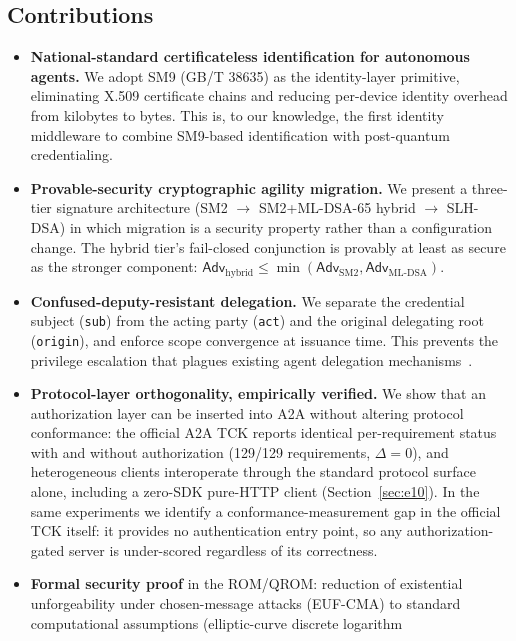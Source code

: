 \documentclass[10pt,twocolumn]{IEEEtran}
\begin{document}
\subsection{Contributions}
\begin{itemize}
  \item \textbf{National-standard certificateless identification for
    autonomous agents.} We adopt SM9 (GB/T 38635) as the identity-layer
    primitive, eliminating X.509 certificate chains and reducing
    per-device identity overhead from kilobytes to bytes. This is, to our
    knowledge, the first identity middleware to combine SM9-based
    identification with post-quantum credentialing.
  \item \textbf{Provable-security cryptographic agility migration.} We
    present a three-tier signature architecture (SM2 $\rightarrow$
    SM2+ML-DSA-65 hybrid $\rightarrow$ SLH-DSA) in which migration is a
    security property rather than a configuration change. The hybrid
    tier's fail-closed conjunction is provably at least as secure as the
    stronger component: $\mathsf{Adv}_{\text{hybrid}} \leq
    \min(\mathsf{Adv}_{\text{SM2}}, \mathsf{Adv}_{\text{ML-DSA}})$.
  \item \textbf{Confused-deputy-resistant delegation.} We separate the
    credential subject (\texttt{sub}) from the acting party
    (\texttt{act}) and the original delegating root (\texttt{origin}),
    and enforce scope convergence at issuance time. This prevents the
    privilege escalation that plagues existing agent delegation
    mechanisms~\cite{ref:agentic-threat-model}.
  \item \textbf{Protocol-layer orthogonality, empirically verified.} We show
    that an authorization layer can be inserted into A2A without altering
    protocol conformance: the official A2A TCK reports identical
    per-requirement status with and without authorization (129/129
    requirements, $\Delta = 0$), and heterogeneous clients interoperate
    through the standard protocol surface alone, including a zero-SDK
    pure-HTTP client (Section~\ref{sec:e10}). In the same experiments we
    identify a conformance-measurement gap in the official TCK itself: it
    provides no authentication entry point, so any authorization-gated
    server is under-scored regardless of its correctness.
  \item \textbf{Formal security proof} in the ROM/QROM: reduction of
    existential unforgeability under chosen-message attacks (EUF-CMA) to
    standard computational assumptions (elliptic-curve discrete logarithm

\end{itemize}
\end{document}
